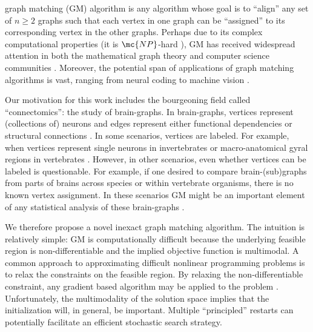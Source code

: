 \documentclass[10pt,journal,cspaper,compsoc]{IEEEtran}
\begin{document}

 graph matching (GM) algorithm is any algorithm whose goal is to ``align'' any set of $n\geq 2$ graphs such that each vertex in one graph can be ``assigned'' to its corresponding vertex in the other graphs.  Perhaps due to its complex computational properties (it is $\mc{NP}$-hard \cite{Garey1979}), GM has received widespread attention in both the mathematical graph theory and computer science communities \cite{Conte2004}.  Moreover, the potential span of applications of graph matching algorithms is vast, ranging from neural coding \cite{Richiardi2010} to machine vision \cite{Wiskott1997}.  

Our motivation for this work includes the bourgeoning field called ``connectomics'': the study of brain-graphs.  In brain-graphs,  vertices represent (collections of) neurons and edges represent either functional dependencies or structural connections \cite{Sporns2010}.  In some scenarios, vertices are labeled.  For example, when vertices represent single neurons in invertebrates \cite{WhiteBrenner86} or macro-anatomical gyral regions in vertebrates \cite{Biswal2010,Bullmore2010}.  However, in other scenarios, even whether vertices can be labeled is questionable.  For example, if one desired to compare brain-(sub)graphs from parts of brains across species or within vertebrate organisms, there is no known vertex assignment.  In these scenarios GM might be an important element of any statistical analysis of these brain-graphs \cite{VP11_sigsub, VP11_unlabeled}.


We therefore propose a novel inexact graph matching algorithm.  The intuition is relatively simple: GM is computationally difficult because the underlying feasible region is non-differentiable and the implied objective function is multimodal.  A common approach to approximating difficult nonlinear programming problems is to relax the constraints on the feasible region.  By relaxing the non-differentiable constraint, any gradient based algorithm may be applied to the problem \cite{Mangasarian1987}. Unfortunately, the multimodality of the solution space implies that the initialization will, in general, be important.  Multiple ``principled'' restarts can potentially facilitate an efficient stochastic search strategy.  
\end{document}
